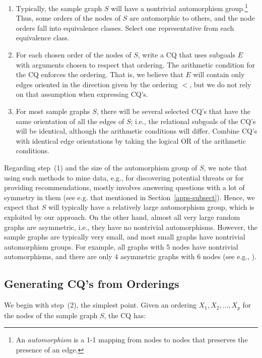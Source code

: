 \begin{enumerate}
\item Typically, the sample graph $S$ will have a nontrivial automorphism group.\footnote{An {\em automorphism} is a 1-1 mapping from nodes to nodes that preserves the presence of an edge.} Thus, some orders of the nodes of $S$ are automorphic to others, and the node orders fall into equivalence classes.  Select one representative from each equivalence class.

\item For each chosen order of the nodes of $S$, write a CQ that uses subgoals $E$ with arguments chosen to respect that ordering.  The arithmetic condition for the CQ enforces the ordering.  That is, we believe that $E$ will contain only edges oriented in the direction given by the ordering $<$, but we do not rely on that assumption when expressing CQ's.

\item For most sample graphs $S$, there will be several selected CQ's that have the same orientation of all the edges of $S$; i.e., the relational subgoals of the CQ's will be identical, although the arithmetic conditions will differ. Combine CQ's with identical edge orientations by taking the logical OR of the arithmetic conditions.
\end{enumerate}

Regarding step~(1) and the size of the automorphism group of $S$, we note that using such methods to mine data, e.g., for discovering potential threats or for providing recommendations, mostly involves answering questions with a lot of symmetry in them (see e.g. that mentioned in Section~\ref{apps-subsect}). Hence, we expect that $S$ will typically have a relatively large automorphism group, which is exploited by our approach.
On the other hand, almost all very large random graphs are asymmetric, i.e., they have no nontrivial automorphisms. However, the sample graphs are typically very small, and most small graphs have nontrivial automorphism groups. For example, all graphs with 5 nodes have nontrivial automorphisms, and there are only 4 asymmetric graphs with 6 nodes (see e.g., \cite{ER63}).

\subsection{Generating CQ's from Orderings}
\label{cq-from-order-subsect}

We begin with step~(2), the simplest point.  Given an ordering $X_1,X_2,\ldots,X_p$ for the nodes of the sample graph $S$, the CQ has:


